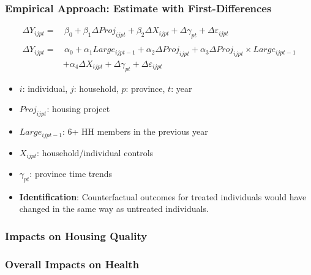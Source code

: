 \documentclass[aspectratio=149]{beamer}
\begin{document}
\begin{frame}
\frametitle{Empirical Approach: Estimate with First-Differences}

\begin{align*}
\Delta Y_{ijpt}  =& \, \beta_0 + \beta_1 \Delta Proj_{ijpt} + \beta_2 \Delta X_{ijpt} + \Delta \gamma_{pt} + \Delta \varepsilon_{ijpt} \\
&\\
\Delta Y_{ijpt}  =& \, \alpha_0 + \alpha_1 Large_{ijpt-1} + \alpha_2 \Delta  Proj_{ijpt} + \alpha_3 \Delta Proj_{ijpt} \times Large_{ijpt-1} \\ 
 &+ \alpha_4 \Delta X_{ijpt}  + \Delta \gamma_{pt} + \Delta \varepsilon_{ijpt} 
\end{align*}
\begin{itemize}
  \item $i$: individual, $j$: household, $p$: province, $t$: year
  \item $Proj_{ijpt}$: housing project
  \item $Large_{ijpt-1}$: 6+ HH members in the previous year
  \item $X_{ijpt}$: household/individual controls
  \item $\gamma_{pt}$: province time trends
\end{itemize}
\begin{itemize}
  \item \textbf{Identification}: Counterfactual outcomes for treated individuals would have changed in the same way as untreated individuals.
\end{itemize}
\end{frame}


\begin{frame}
\frametitle{Impacts on Housing Quality}
\resizebox{\textwidth}{!}{  

}
\end{frame}



\begin{frame}
\frametitle{Overall Impacts on Health}
\resizebox{\textwidth}{!}{  

}
\end{frame}
\end{document}
